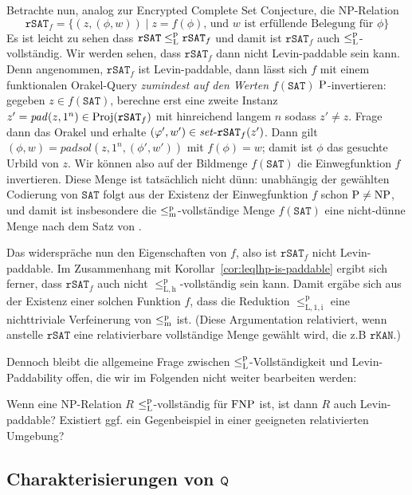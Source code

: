 Betrachte nun, analog zur Encrypted Complete Set Conjecture, die NP-Relation
\[ \mathtt{rSAT}_f = \{ (z, (\phi, w)) \mid \text{$z=f(\phi)$, und $w$ ist erfüllende Belegung für $\phi$} \} \]
Es ist leicht zu sehen dass $\mathtt{rSAT}\leqlp \mathtt{rSAT}_f$ und damit ist $\mathtt{rSAT}_f$ auch $\leqlp$-vollständig.
Wir werden sehen, dass $\mathtt{rSAT}_f$ dann nicht Levin-paddable sein kann.
Denn angenommen, $\mathtt{rSAT}_f$ ist Levin-paddable, dann lässt sich $f$ mit einem funktionalen Orakel-Query \emph{zumindest auf den Werten $f(\mathtt{SAT})$} $\P$-invertieren: gegeben $z\in f(\mathtt{SAT})$, berechne erst eine zweite Instanz $z'=\mathit{pad}(z, 1^n)\in\Proj(\mathtt{rSAT}_f)$ mit hinreichend langem $n$ sodass $z'\neq z$. Frage dann das Orakel und erhalte $(\phi', w')\in \fset{}\mathtt{rSAT}_f(z')$.
Dann gilt $(\phi,w) = \mathit{padsol}(z, 1^n, (\phi',w'))$ mit $f(\phi)=w$; damit ist $\phi$ das gesuchte Urbild von $z$.
Wir können also auf der Bildmenge  $f(\mathtt{SAT})$ die Einwegfunktion $f$ invertieren.
Diese Menge ist tatsächlich nicht dünn: unabhängig der gewählten Codierung von $\mathtt{SAT}$ folgt aus der Existenz der Einwegfunktion $f$ schon $\P\neq\NP$, und damit ist insbesondere die $\leqmp$-vollständige Menge $f(\mathtt{SAT})$ eine nicht-dünne Menge nach dem Satz von \textcite{mahaney_sparse_1982}.

Das widerspräche nun den Eigenschaften von $f$, also ist $\mathtt{rSAT}_f$ nicht Levin-paddable.
Im Zusammenhang mit Korollar~\ref{cor:leqlhp-is-paddable} ergibt sich ferner, dass $\mathtt{rSAT}_f$ auch nicht $\leq_\mathrm{L,h}^\mathrm p$-vollständig sein kann. Damit ergäbe sich aus der Existenz einer solchen Funktion $f$, dass die Reduktion $\leq_\mathrm{L,1,i}^\mathrm p$ eine nichttriviale Verfeinerung von $\leqmp$ ist.
(Diese Argumentation relativiert, wenn anstelle $\mathtt{rSAT}$ eine relativierbare vollständige Menge gewählt wird, die z.B $\mathtt{rKAN}$.)

Dennoch bleibt die allgemeine Frage zwischen $\leqlp$-Vollständigkeit und Levin-Paddability offen, die wir im Folgenden nicht weiter bearbeiten werden:
\begin{question}\label{question:levin-paddable}
    Wenn eine NP-Relation $R$ $\leqlp$-vollständig für $\FNP$ ist, ist dann $R$ auch Levin-paddable?
    Existiert ggf. ein Gegenbeispiel in einer geeigneten relativierten Umgebung?
\end{question}

\subsection*{Charakterisierungen von $\hQ$}

